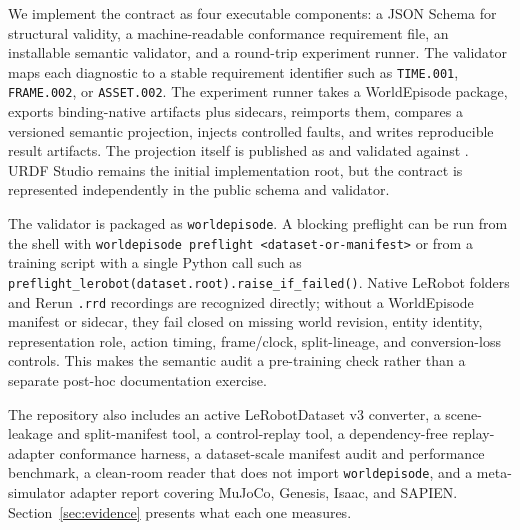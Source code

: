 We implement the contract as four executable components: a JSON Schema for structural validity, a
machine-readable conformance requirement file, an installable semantic validator, and a round-trip
experiment runner. The validator maps each diagnostic to a stable requirement identifier such as
\texttt{TIME.001}, \texttt{FRAME.002}, or \texttt{ASSET.002}. The experiment runner takes a
WorldEpisode package, exports binding-native artifacts plus sidecars, reimports them, compares a
versioned semantic projection, injects controlled faults, and writes reproducible result artifacts.
The projection itself is published as  and
validated against . URDF Studio remains the initial
implementation root, but the contract is represented independently in the public schema and
validator.

The validator is packaged as \texttt{worldepisode}. A blocking preflight can be run from the shell
with \texttt{worldepisode preflight <dataset-or-manifest>} or from a training script with a single
Python call such as \texttt{preflight\_lerobot(dataset.root).raise\_if\_failed()}. Native LeRobot
folders and Rerun \texttt{.rrd} recordings are recognized directly; without a WorldEpisode
manifest or sidecar, they fail closed on missing world revision, entity identity, representation
role, action timing, frame/clock, split-lineage, and conversion-loss controls. This makes the
semantic audit a pre-training check rather than a separate post-hoc documentation exercise.

The repository also includes an active LeRobotDataset v3 converter, a scene-leakage and
split-manifest tool, a control-replay tool, a dependency-free replay-adapter conformance harness, a
dataset-scale manifest audit and performance benchmark, a clean-room reader that does not import
\texttt{worldepisode}, and a meta-simulator adapter report covering MuJoCo, Genesis, Isaac, and
SAPIEN. Section~\ref{sec:evidence} presents what each one measures.
